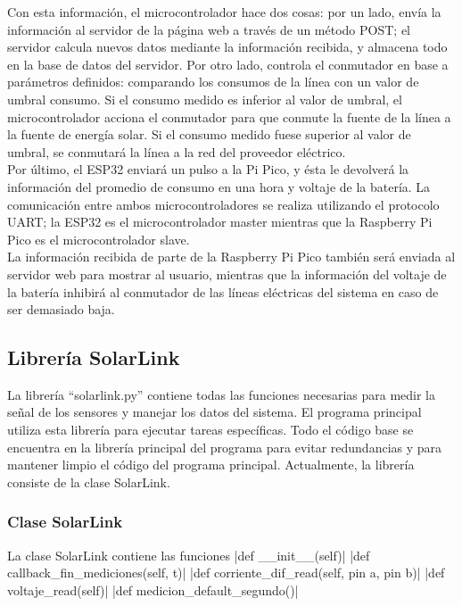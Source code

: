 Con esta información, el microcontrolador hace dos cosas: por un lado, envía la información al servidor de la página web a través de un método POST; el servidor calcula nuevos datos mediante la información recibida, y almacena todo en la base de datos del servidor. Por otro lado, controla el conmutador en base a parámetros definidos: comparando los consumos de la línea con un valor de umbral consumo. Si el consumo medido es inferior al valor de umbral, el microcontrolador acciona el conmutador para que conmute la fuente de la línea a la fuente de energía solar. Si el consumo medido fuese superior al valor de umbral, se conmutará la línea a la red del proveedor eléctrico.\\

Por último, el ESP32 enviará un pulso a la Pi Pico, y ésta le devolverá la información del promedio de consumo en una hora y voltaje de la batería. La comunicación entre ambos microcontroladores se realiza utilizando el protocolo UART; la ESP32 es el microcontrolador master mientras que la Raspberry Pi Pico es el microcontrolador slave.\\ 

La información recibida de parte de la Raspberry Pi Pico también será enviada al servidor web para mostrar al usuario, mientras que la información del voltaje de la batería inhibirá al conmutador de las líneas eléctricas del sistema en caso de ser demasiado baja.\\


\subsection{Librería SolarLink}

La librería “solarlink.py” contiene todas las funciones necesarias para medir la señal de los sensores y manejar los datos del sistema. El programa principal utiliza esta librería para ejecutar tareas específicas. Todo el código base se encuentra en la librería principal del programa para evitar redundancias y para mantener limpio el código del programa principal. Actualmente, la librería consiste de la clase SolarLink.

\subsubsection{Clase SolarLink}

La clase SolarLink contiene las funciones 
|def __init__(self)| 
|def callback_fin_mediciones(self, t)|
|def corriente_dif_read(self, pin a, pin b)|
|def voltaje_read(self)|
|def medicion_default_segundo()|

